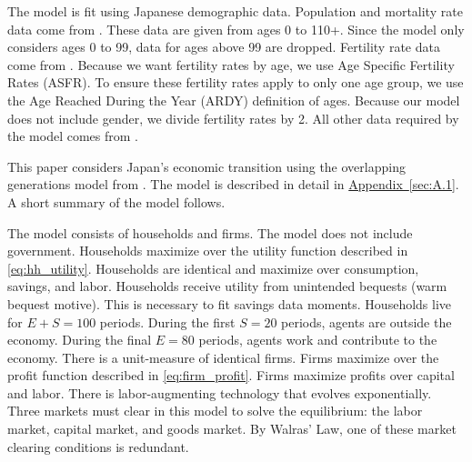\documentclass[10pt]{article}
\renewcommand{\thesection}{\arabic{section}}
\newcommand{\aref}[1]{\hyperref[#1]{Appendix~\ref{#1}}}
\renewcommand{\section}[2][]{\oldsection[#1]{#2}\index{#1}\label{sec:\thesection}}
\numberwithin{equation}{subsection}
\begin{document}
\par The model is fit using Japanese demographic data. Population and mortality rate data come from \cite{JMD2018}. These data are given from ages 0 to 110+. Since the model only considers ages 0 to 99, data for ages above 99 are dropped. Fertility rate data come from \cite{HFC2018}. Because we want fertility rates by age, we use Age Specific Fertility Rates (ASFR). To ensure these fertility rates apply to only one age group, we use the Age Reached During the Year (ARDY) definition of ages. Because our model does not include gender, we divide fertility rates by 2. All other data required by the model comes from \cite{E2020}.


\section{Model}

\par This paper considers Japan's economic transition using the overlapping generations model from \cite{E2020}. The model is described in detail in \aref{sec:A.1}. A short summary of the model follows.

\par The model consists of households and firms. The model does not include government. Households maximize over the utility function described in \ref{eq:hh_utility}. Households are identical and maximize over consumption, savings, and labor. Households receive utility from unintended bequests (warm bequest motive). This is necessary to fit savings data moments. Households live for \(E+S=100\) periods. During the first \(S=20\) periods, agents are outside the economy. During the final \(E=80\) periods, agents work and contribute to the economy. There is a unit-measure of identical firms. Firms maximize over the profit function described in \ref{eq:firm_profit}. Firms maximize profits over capital and labor. There is labor-augmenting technology that evolves exponentially. Three markets must clear in this model to solve the equilibrium: the labor market, capital market, and goods market. By Walras' Law, one of these market clearing conditions is redundant.
\end{document}

